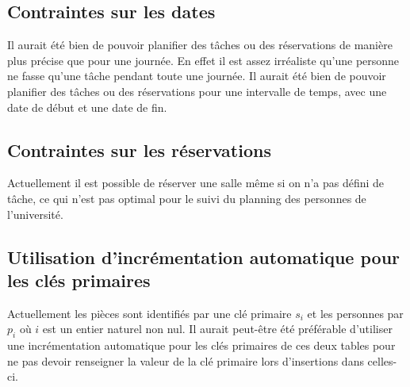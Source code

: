 \subsection{Contraintes sur les dates}
Il aurait été bien de pouvoir planifier des tâches ou des réservations de manière plus précise que pour une journée. En effet il est assez irréaliste qu'une personne ne fasse qu'une tâche pendant toute une journée. Il aurait été bien de pouvoir planifier des tâches ou des réservations pour une intervalle de temps, avec une date de début et une date de fin. 

\subsection{Contraintes sur les réservations}
Actuellement il est possible de réserver une salle même si on n'a pas défini de tâche, ce qui n'est pas optimal pour le suivi du planning des personnes de l'université.

\subsection{Utilisation d'incrémentation automatique pour les clés primaires}
Actuellement les pièces sont identifiés par une clé primaire $s_{i}$ et les personnes par $p_{i}$ où $i$ est un entier naturel non nul. Il aurait peut-être été préférable d'utiliser une incrémentation automatique pour les clés primaires de ces deux tables pour ne pas devoir renseigner la valeur de la clé primaire lors d'insertions dans celles-ci.